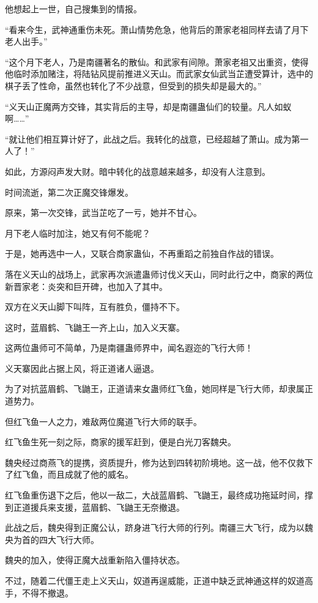 \begin{this_body}
他想起上一世，自己搜集到的情报。

“看来今生，武神通重伤未死。萧山情势危急，他背后的萧家老祖同样去请了月下老人出手。”

“这个月下老人，乃是南疆著名的散仙。和武家有间隙。萧家老祖又出重资，使得他临时添加赌注，将陆钻风提前推进义天山。而武家女仙武当芷遭受算计，选中的棋子丢了性命，虽然也转化了不少战意，但受到的损失却是最大的。”

“义天山正魔两方交锋，其实背后的主导，却是南疆蛊仙们的较量。凡人如蚁啊……”

“就让他们相互算计好了，此战之后。我转化的战意，已经超越了萧山。成为第一人了！”

如此，方源闷声发大财。暗中转化的战意越来越多，却没有人注意到。

时间流逝，第二次正魔交锋爆发。

原来，第一次交锋，武当芷吃了一亏，她并不甘心。

月下老人临时加注，她又有何不能呢？

于是，她再选中一人，又联合商家蛊仙，不再重蹈之前独自作战的错误。

落在义天山的战场上，武家再次派遣蛊师讨伐义天山，同时此行之中，商家的两位新晋家老：炎突和巨开碑，也加入了其中。

双方在义天山脚下叫阵，互有胜负，僵持不下。

这时，蓝眉鹤、飞鼬王一齐上山，加入义天寨。

这两位蛊师可不简单，乃是南疆蛊师界中，闻名遐迩的飞行大师！

义天寨因此占据上风，将正道诸人逼退。

为了对抗蓝眉鹤、飞鼬王，正道请来女蛊师红飞鱼，她同样是飞行大师，却隶属正道势力。

但红飞鱼一人之力，难敌两位魔道飞行大师的联手。

红飞鱼生死一刻之际，商家的援军赶到，便是白光刀客魏央。

魏央经过商燕飞的提携，资质提升，修为达到四转初阶境地。这一战，他不仅救下了红飞鱼，而且成就了他的威名。

红飞鱼重伤退下之后，他以一敌二，大战蓝眉鹤、飞鼬王，最终成功拖延时间，撑到正道援兵来支援，蓝眉鹤、飞鼬王无奈撤退。

此战之后，魏央得到正魔公认，跻身进飞行大师的行列。南疆三大飞行，成为以魏央为首的四大飞行大师。

魏央的加入，使得正魔大战重新陷入僵持状态。

不过，随着二代僵王走上义天山，奴道再逞威能，正道中缺乏武神通这样的奴道高手，不得不撤退。


\end{this_body}
